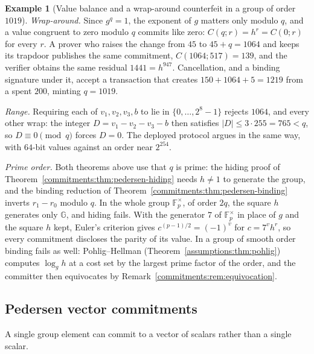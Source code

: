 \documentclass[11pt,a4paper]{article}
\theoremstyle{definition}
\newtheorem{example}[theorem]{Example}
\theoremstyle{remark}
\newcommand{\F}{\ensuremath{\mathbb{F}}}
\newcommand{\G}{\ensuremath{\mathbb{G}}}
\providecommand{\abs}[1]{\lvert #1 \rvert}
\begin{document}
\begin{example}[Value balance and a wrap-around counterfeit in a group of
order \(1019\)]
\emph{Wrap-around.} Since \(g^{q} = 1\), the exponent of \(g\) matters
only modulo \(q\), and a value congruent to zero modulo \(q\) commits like
zero: \(C(q; r) = h^{r} = C(0; r)\) for every \(r\). A prover who raises
the change from \(45\) to \(45 + q = 1064\) and keeps its trapdoor
publishes the same commitment, \(C(1064; 517) = 139\), and the verifier
obtains the same residual \(1441 = h^{947}\). Cancellation, and a binding
signature under it, accept a transaction that creates
\(150 + 1064 + 5 = 1219\) from a spent \(200\), minting \(q = 1019\).

\emph{Range.} Requiring each of \(v_1, v_2, v_3, b\) to lie in
\(\{0, \dots, 2^{8} - 1\}\) rejects \(1064\), and every other wrap: the
integer \(D = v_1 - v_2 - v_3 - b\) then satisfies
\(\abs{D} \le 3 \cdot 255 = 765 < q\), so \(D \equiv 0 \pmod q\) forces
\(D = 0\). The deployed protocol argues in the same way, with \(64\)-bit
values against an order near \(2^{254}\).

\emph{Prime order.} Both theorems above use that \(q\) is prime: the
hiding proof of Theorem~\ref{commitments:thm:pedersen-hiding} needs
\(h \ne 1\) to generate the group, and the binding reduction of
Theorem~\ref{commitments:thm:pedersen-binding} inverts \(r_1 - r_0\)
modulo \(q\). In the whole group \(\F_{p}^{\times}\), of order \(2q\),
the square \(h\) generates only \(\G\), and hiding fails. With the
generator \(7\) of \(\F_{p}^{\times}\) in place
of \(g\) and the square \(h\) kept, Euler's criterion gives
\(c^{(p-1)/2} = (-1)^{v}\) for \(c = 7^{v} h^{r}\), so every commitment
discloses the parity of its value. In a group of smooth order binding
fails as well: Pohlig--Hellman (Theorem~\ref{assumptions:thm:pohlig})
computes \(\log_g h\) at a cost set by the largest prime factor of the
order, and the committer then equivocates by
Remark~\ref{commitments:rem:equivocation}.
\end{example}

\subsection{Pedersen vector commitments}
\label{commitments:subsec:pedersen-vector}

A single group element can commit to a vector of scalars rather than a
single scalar.
\end{document}
